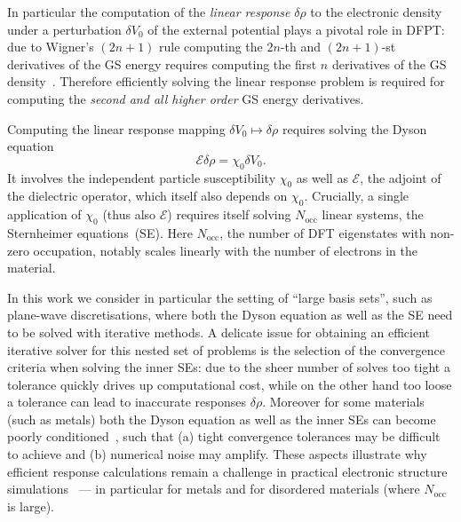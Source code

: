 \documentclass[hidelinks,onefignum,onetabnum]{siamart250211}
\newcommand{\Nocc}{N_{\mathrm{occ}}}
\begin{document}
In particular the computation of the \textit{linear response} $\delta\rho$
to the electronic density under a perturbation $\delta V_0$ of the external
potential plays a pivotal role in DFPT:
due to Wigner's $(2n+1)$ rule computing the $2n$-th and $(2n+1)$-st
derivatives of the GS energy requires computing the first $n$ derivatives of the GS density~\cite{gonze1995adiabatic,Gonze1995}.
Therefore efficiently solving the linear response problem is required
for computing the \textit{second and all higher order} GS energy derivatives.
%

Computing the linear response mapping $\delta V_0 \mapsto \delta\rho$
requires solving the Dyson equation
\begin{equation}
    \mathcal{E} \delta \rho = \chi_0 \delta V_0.
    \label{eqn:dyson}
\end{equation}
%
It involves the independent particle susceptibility $\chi_0$ as well as
$\mathcal{E}$, the adjoint of the dielectric operator,
which itself also depends on $\chi_0$.
Crucially, a single application of $\chi_0$ (thus also $\mathcal{E}$)
requires itself solving $\Nocc$ linear systems,
the Sternheimer equations~(SE).
Here $\Nocc$,
the number of DFT eigenstates with non-zero occupation,
notably scales linearly with the number of electrons in the material.
%

In this work we consider in particular the setting of ``large basis sets'',
such as plane-wave discretisations, where both the Dyson equation as well as the SE
need to be solved with iterative methods.
A delicate issue for obtaining an efficient iterative solver for this
nested set of problems is the selection of the convergence criteria
when solving the inner SEs:
due to the sheer number of solves too tight a tolerance quickly drives up computational cost,
while on the other hand too loose a tolerance can lead to inaccurate responses $\delta\rho$.
Moreover for some materials (such as metals) both the Dyson equation
as well as the inner SEs can become poorly conditioned~\cite{cances2023numerical},
such that (a) tight convergence tolerances may be difficult to achieve
and (b) numerical noise may amplify.
These aspects illustrate why efficient response calculations
remain a challenge in practical electronic structure simulations~\cite{Gonze2024}
--- in particular for metals and for disordered materials (where $\Nocc$ is large).
%
%
\end{document}
